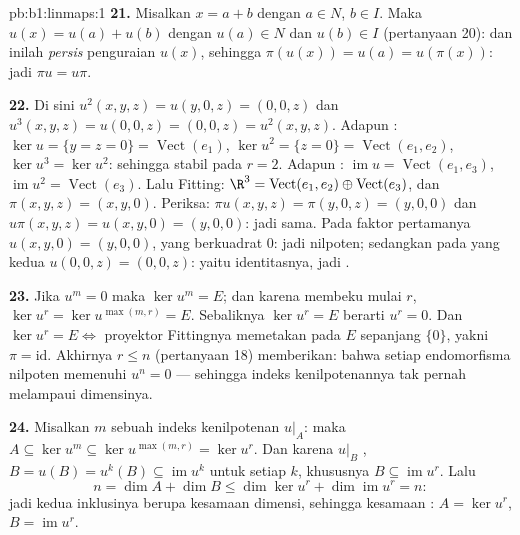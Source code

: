 \begin{solution}{pb:b1:linmaps:1}
\textbf{21.} Misalkan $x = a + b$ dengan $a \in N$, $b \in I$. Maka
$u(x) = u(a) + u(b)$ dengan $u(a) \in N$ dan $u(b) \in I$
(pertanyaan 20): dan inilah \emph{persis} penguraian $u(x)$, sehingga
$\pi(u(x)) = u(a) = u(\pi(x))$: jadi $\pi u = u\pi$.

\textbf{22.} Di sini $u^2(x,y,z) = u(y, 0, z) = (0, 0, z)$ dan
$u^3(x,y,z) = u(0,0,z) = (0,0,z) = u^2(x,y,z)$. Adapun : $\ker u
= \{y = z = 0\} = \operatorname{Vect}(e_1)$, $\ker u^2 = \{z =
0\} = \operatorname{Vect}(e_1, e_2)$, $\ker u^3 = \ker u^2$:
sehingga stabil pada $r = 2$. Adapun : $\operatorname{im} u =
\operatorname{Vect}(e_1, e_3)$, $\operatorname{im} u^2 =
\operatorname{Vect}(e_3)$. Lalu Fitting: $\R^3 =
\operatorname{Vect}(e_1, e_2) \oplus \operatorname{Vect}(e_3)$,
dan $\pi(x, y, z) = (x, y, 0)$. Periksa: $\pi u(x,y,z) = \pi(y, 0,
z) = (y, 0, 0)$ dan $u\pi(x,y,z) = u(x, y, 0) = (y, 0, 0)$:
jadi sama. Pada faktor pertamanya $u(x, y, 0) = (y, 0, 0)$, yang
berkuadrat $0$: jadi nilpoten; sedangkan pada yang kedua $u(0,0,z) = (0,0,z)$:
yaitu identitasnya, jadi .

\textbf{23.} Jika $u^m = 0$ maka $\ker u^m = E$; dan karena 
membeku mulai $r$, $\ker u^{r} = \ker u^{\max(m, r)} = E$.
Sebaliknya $\ker u^{r} = E$ berarti $u^{r} = 0$. Dan $\ker u^{r} =
E \iff$ proyektor Fittingnya memetakan pada $E$ sepanjang $\{0\}$, yakni
$\pi = \mathrm{id}$. Akhirnya $r \leq n$ (pertanyaan 18) memberikan:
bahwa setiap endomorfisma nilpoten memenuhi $u^{n} = 0$ --- sehingga
indeks kenilpotenannya tak pernah melampaui dimensinya.

\textbf{24.} Misalkan $m$ sebuah indeks kenilpotenan $u|_A$: maka $A
\subseteq \ker u^{m} \subseteq \ker u^{\max(m,r)} = \ker u^{r}$.
Dan karena $u|_B$ , $B = u(B) = u^{k}(B) \subseteq
\operatorname{im} u^{k}$ untuk setiap $k$, khususnya $B
\subseteq \operatorname{im} u^{r}$. Lalu
\[
n = \dim A + \dim B \leq \dim\ker u^{r} +
\dim\operatorname{im} u^{r} = n :
\]
jadi kedua inklusinya berupa kesamaan dimensi, sehingga kesamaan
: $A = \ker u^{r}$, $B = \operatorname{im} u^{r}$.


\end{solution}
